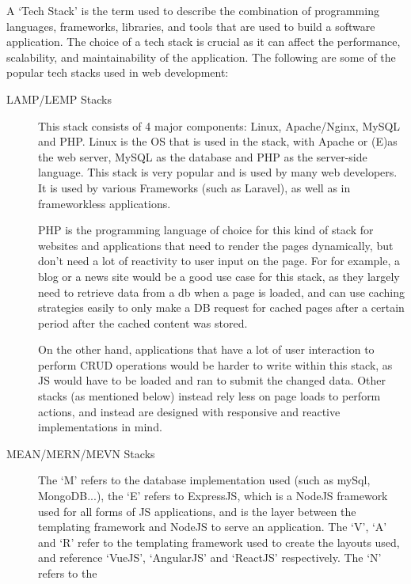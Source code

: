 \documentclass[12pt, a4paper,twoside]{report}
\theoremstyle{plain} %
\theoremstyle{definition} %
\numberwithin{equation}{chapter}
\begin{document}
A `Tech Stack' is the term used to describe the combination of programming
languages, frameworks, libraries, and tools that are used to build a software
application. The choice of a tech stack is crucial as it can affect the
performance, scalability, and maintainability of the application. The following
are some of the popular tech stacks used in web development:

\begin{description}
    \item[LAMP/LEMP Stacks] {
        This stack consists of 4 major components: Linux, Apache/Nginx, MySQL
        and PHP\@. Linux is the OS that is used in the stack, with Apache or
        (E)\@nginx as the web server, MySQL as the database and PHP as the
        server-side language. This stack is very popular and is used by many
        web developers. It is used by various Frameworks (such as Laravel), as
        well as in frameworkless applications.

        PHP is the programming language of choice for this kind of stack for
        websites and applications that need to render the pages dynamically,
        but don't need a lot of reactivity to user input on the page. For
        for example, a blog or a news site would be a good use case for this
        stack, as they largely need to retrieve data from a db when a page is
        loaded, and can use caching strategies easily to only make a DB request
        for cached pages after a certain period after the cached content was stored.

        On the other hand, applications that have a lot of user interaction to perform
        CRUD operations would be harder to write within this stack, as JS would have
        to be loaded and ran to submit the changed data. Other stacks (as mentioned below)
        instead rely less on page loads to perform actions, and instead are designed
        with responsive and reactive implementations in mind.
    }
    \item[MEAN/MERN/MEVN Stacks] {
        The `M' refers to the database implementation used (such as mySql, MongoDB...),
        the `E' refers to ExpressJS, which is a NodeJS framework used for all forms of
        JS applications, and is the layer between the templating framework and NodeJS to
        serve an application. The `V', `A' and `R' refer to the templating framework used
        to create the layouts used, and reference `VueJS', `AngularJS' and `ReactJS'
        respectively. The `N' refers to the 
    }
\end{description}
\end{document}
